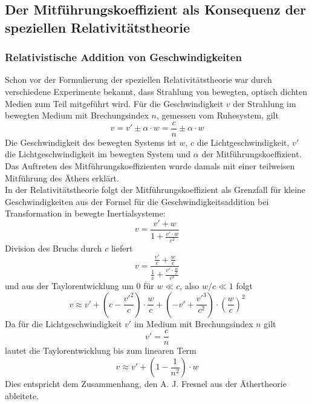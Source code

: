 \subsection{Der Mitführungskoeffizient als Konsequenz der speziellen Relativitätstheorie}

\subsubsection*{Relativistische Addition von Geschwindigkeiten}
Schon vor der Formulierung der speziellen Relativitätstheorie war durch verschiedene Experimente bekannt,
dass Strahlung von bewegten, optisch dichten Medien zum Teil mitgeführt wird.
Für die Geschwindigkeit $v$ der Strahlung im bewegten Medium mit Brechungsindex $n$, gemessen vom Ruhesystem,
gilt
\begin{equation}
\label{}
v = v' \pm \alpha \cdot w = \frac{c}{n} \pm \alpha \cdot w
\end{equation}
Die Geschwindigkeit des bewegten Systems ist $w$, $c$ die Lichtgeschwindigkeit,
$v'$ die Lichtgeschwindigkeit im bewegten System und
$\alpha$ der Mitführungskoeffizient.
Das Auftreten des Mitführungskoeffizienten wurde damals mit einer teilweisen Mitführung des Äthers erklärt.\\
In der Relativitätstheorie folgt der Mitführungskoeffizient als Grenzfall für kleine Geschwindigkeiten
aus der Formel für die Geschwindigkeitsaddition bei Transformation in bewegte Inertialsysteme:
\begin{equation}
\label{}
v=\frac{v'+w}{1+\frac{v' \cdot w}{c^2}}
\end{equation}
Division des Bruchs durch $c$ liefert
\begin{equation}
\label{}
v=\frac{\frac{v'}{c}+\frac{w}{c}}{\frac{1}{c}+\frac{v' \cdot \frac{w}{c}}{c^2}}
\end{equation}
und aus der Taylorentwicklung um 0 für $w \ll c$, also $w/c \ll 1$ folgt
\begin{equation}
\label{}
v \approx v' + (c-\frac{v'^2}{c})\cdot \frac{w}{c}+ (-v'+\frac{v'^3}{c^2})\cdot \left(\frac{w}{c}\right)^2
\end{equation}
Da für die Lichtgeschwindigkeit $v'$ im Medium mit Brechungsindex $n$ gilt
\begin{equation}
\label{}
v'=\frac{c}{n}
\end{equation}
lautet die Taylorentwicklung bis zum linearen Term
\begin{equation}
\label{}
v \approx v' + (1-\frac{1}{n^2})\cdot w
\end{equation}
Dies entspricht dem Zusammenhang, den A. J. Fresnel aus der Äthertheorie ableitete.

